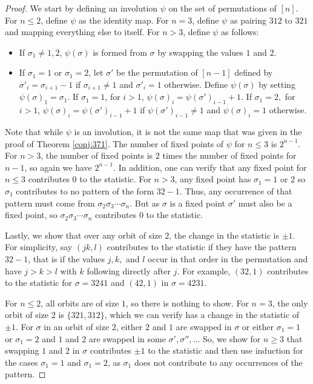 \documentclass{amsart}
\theoremstyle{definition}
\begin{document}
\begin{proof}
  We start by defining an involution $\psi$ on the set of permutations of $[n].$ For $n \leq 2$, define $\psi$ as the identity map.  For $n = 3$, define $\psi$ as pairing $312$ to $321$ and mapping everything else to itself.
For $n > 3$, define $\psi$ as follows:
  \begin{itemize}
    \item If $\sigma_1 \neq 1, 2$, $\psi(\sigma)$ is formed from $\sigma$ by swapping the values $1$ and $2$.
    \item If $\sigma_1 =1$ or $\sigma_1=2$, let $\sigma'$ be the permutation of $[n-1]$ defined by $\sigma'_i = \sigma_{i + 1} - 1$ if $\sigma_{i+1} \neq 1$ and $\sigma'_i = 1$ otherwise. Define $\psi(\sigma)$ by setting $\psi(\sigma)_1 = \sigma_1$. If $\sigma_1 = 1$, for $i > 1$, $\psi(\sigma)_i = \psi(\sigma')_{i-1} + 1$. If $\sigma_1 = 2,$ for $i > 1$, $\psi(\sigma)_i = \psi(\sigma')_{i-1} + 1$ if $\psi(\sigma')_{i-1} \neq 1$ and $\psi(\sigma)_i = 1$ otherwise.
  \end{itemize}
  Note that while $\psi$ is an involution, it is not the same map that was given in the proof of Theorem \ref{conj:371}.  The number of fixed points of $\psi$ for $n \leq 3$ is $2^{n-1}$. For $n > 3$, the number of fixed points is $2$ times the number of fixed points for $n - 1$, so again we have $2^{n-1}$. In addition, one can verify that any fixed point for $n \leq 3$ contributes 0 to the statistic. For $n > 3$, any fixed point has $\sigma_1 = 1$ or $2$ so $\sigma_1$ contributes to no pattern of the form $32-1$. Thus, any occurrence of that pattern must come from $\sigma_2\sigma_3\dotsm\sigma_n$. But as $\sigma$ is a fixed point $\sigma'$ must also be a fixed point, so $\sigma_2\sigma_3\dotsm\sigma_n$ contributes 0 to the statistic.

  Lastly, we show that over any orbit of size $2$, the change in the statistic is $\pm 1$. For simplicity,  say $(jk,l)$ contributes to the statistic if they have the pattern $32-1$, that is if the values $j,k,$ and $l$ occur in that order in the permutation and have $j > k > l$ with $k$ following directly after $j$. For example, $(32,1)$ contributes to the statistic for $\sigma = 3241$ and $(42,1)$  in $\sigma=4231$.

  For $n \leq 2$, all orbits are of size $1$, so there is nothing to show. For $n = 3$, the only orbit of size $2$ is $\{321, 312\}$, which we can verify has a change in the statistic of $\pm 1$. For $\sigma$ in an orbit of size $2$, either $2$ and $1$ are swapped in $\sigma$ or  either $\sigma_1 =1$ or $\sigma_1=2$ and $1$ and $2$ are swapped in some $\sigma', \sigma'', \dotsc$ So, we show for $n \geq 3$ that swapping $1$ and $2$ in $\sigma$ contributes $\pm 1$ to the statistic and then use induction for the cases $\sigma_1=1$ and $\sigma_1=2$, as $\sigma_1$ does not contribute to any occurrences of the pattern.


\end{proof}
\end{document}
